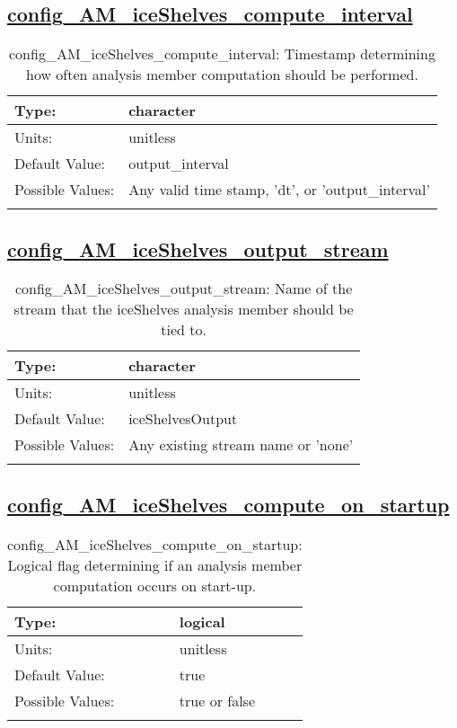 \subsection[config\_AM\_iceShelves\_compute\_interval]{\hyperref[sec:nm_tab_AM_iceShelves]{config\_AM\_iceShelves\_compute\_interval}}
\label{subsec:nm_sec_config_AM_iceShelves_compute_interval}
\begin{center}
\begin{longtable}{| p{2.0in} || p{4.0in} |}
    \hline
    Type: & character \\
    \hline
    Units: & \si{unitless} \\
    \hline
    Default Value: & output\_interval \\
    \hline
    Possible Values: & Any valid time stamp, 'dt', or 'output\_interval' \\
    \hline
    \caption{config\_AM\_iceShelves\_compute\_interval: Timestamp determining how often analysis member computation should be performed.}
\end{longtable}
\end{center}
\subsection[config\_AM\_iceShelves\_output\_stream]{\hyperref[sec:nm_tab_AM_iceShelves]{config\_AM\_iceShelves\_output\_stream}}
\label{subsec:nm_sec_config_AM_iceShelves_output_stream}
\begin{center}
\begin{longtable}{| p{2.0in} || p{4.0in} |}
    \hline
    Type: & character \\
    \hline
    Units: & \si{unitless} \\
    \hline
    Default Value: & iceShelvesOutput \\
    \hline
    Possible Values: & Any existing stream name or 'none' \\
    \hline
    \caption{config\_AM\_iceShelves\_output\_stream: Name of the stream that the iceShelves analysis member should be tied to.}
\end{longtable}
\end{center}
\subsection[config\_AM\_iceShelves\_compute\_on\_startup]{\hyperref[sec:nm_tab_AM_iceShelves]{config\_AM\_iceShelves\_compute\_on\_startup}}
\label{subsec:nm_sec_config_AM_iceShelves_compute_on_startup}
\begin{center}
\begin{longtable}{| p{2.0in} || p{4.0in} |}
    \hline
    Type: & logical \\
    \hline
    Units: & \si{unitless} \\
    \hline
    Default Value: & true \\
    \hline
    Possible Values: & true or false \\
    \hline
    \caption{config\_AM\_iceShelves\_compute\_on\_startup: Logical flag determining if an analysis member computation occurs on start-up.}
\end{longtable}
\end{center}
